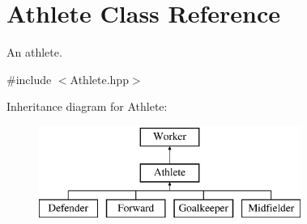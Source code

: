 \hypertarget{class_athlete}{}\section{Athlete Class Reference}
\label{class_athlete}


An athlete.  




{\ttfamily \#include $<$Athlete.\+hpp$>$}

Inheritance diagram for Athlete\+:\begin{figure}[H]
\begin{center}
\leavevmode
\includegraphics[height=3.000000cm]{class_athlete}
\end{center}
\end{figure}
